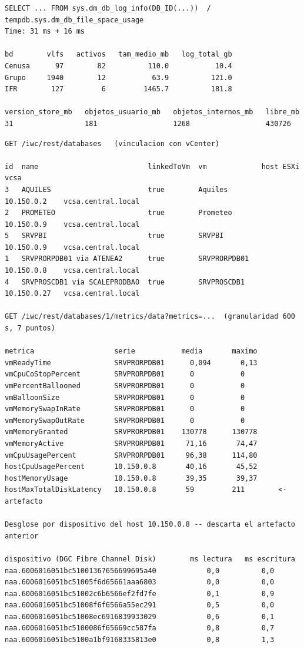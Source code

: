 \documentclass[11pt,a4paper]{article}
\begin{document}
\begin{lstlisting}[style=salida]
SELECT ... FROM sys.dm_db_log_info(DB_ID(...))  /  tempdb.sys.dm_db_file_space_usage
Time: 31 ms + 16 ms

bd        vlfs   activos   tam_medio_mb   log_total_gb
Cenusa      97        82          110.0           10.4
Grupo     1940        12           63.9          121.0
IFR        127         6         1465.7          181.8

version_store_mb   objetos_usuario_mb   objetos_internos_mb   libre_mb
31                 181                  1268                  430726
\end{lstlisting}

\begin{lstlisting}[style=salida]
GET /iwc/rest/databases   (vinculacion con vCenter)

id  name                          linkedToVm  vm             host ESXi     vcsa
3   AQUILES                       true        Aquiles        10.150.0.2    vcsa.central.local
2   PROMETEO                      true        Prometeo       10.150.0.9    vcsa.central.local
5   SRVPBI                        true        SRVPBI         10.150.0.9    vcsa.central.local
1   SRVPRORPDB01 via ATENEA2      true        SRVPRORPDB01   10.150.0.8    vcsa.central.local
4   SRVPROSCDB1 via SCALEPRODBAO  true        SRVPROSCDB1    10.150.0.27   vcsa.central.local

GET /iwc/rest/databases/1/metrics/data?metrics=...  (granularidad 600 s, 7 puntos)

metrica                   serie           media       maximo
vmReadyTime               SRVPRORPDB01      0,094       0,13
vmCpuCoStopPercent        SRVPRORPDB01      0           0
vmPercentBallooned        SRVPRORPDB01      0           0
vmBalloonSize             SRVPRORPDB01      0           0
vmMemorySwapInRate        SRVPRORPDB01      0           0
vmMemorySwapOutRate       SRVPRORPDB01      0           0
vmMemoryGranted           SRVPRORPDB01    130778      130778
vmMemoryActive            SRVPRORPDB01     71,16       74,47
vmCpuUsagePercent         SRVPRORPDB01     96,38      114,80
hostCpuUsagePercent       10.150.0.8       40,16       45,52
hostMemoryUsage           10.150.0.8       39,35       39,37
hostMaxTotalDiskLatency   10.150.0.8       59         211        <- artefacto

Desglose por dispositivo del host 10.150.0.8 -- descarta el artefacto anterior

dispositivo (DGC Fibre Channel Disk)        ms lectura   ms escritura
naa.6006016051bc51001367656699695a40            0,0          0,0
naa.6006016051bc51005f6d65661aaa6803            0,0          0,0
naa.6006016051bc51002c6b6566ef2fd7fe            0,1          0,9
naa.6006016051bc51008f6f6566a55ec291            0,5          0,0
naa.6006016051bc51008ec6916839933029            0,6          0,1
naa.6006016051bc5100086f65669cc587fa            0,8          0,7
naa.6006016051bc5100a1bf9168335813e0            0,8          1,3
\end{lstlisting}
\end{document}
